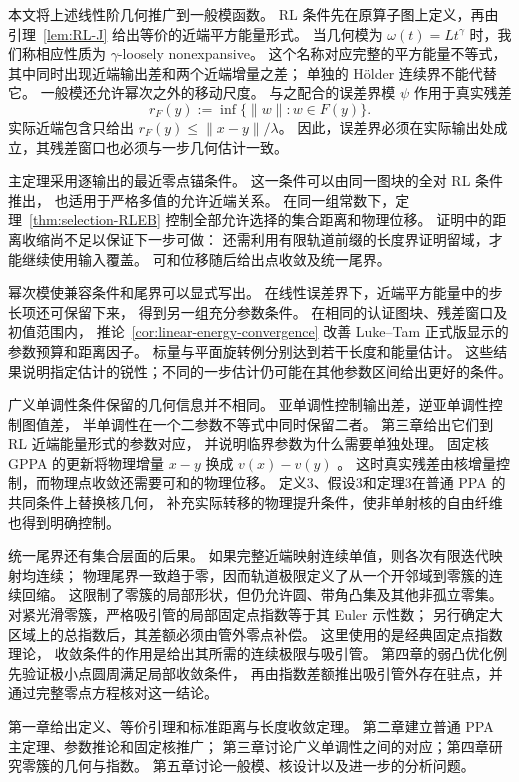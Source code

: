 本文将上述线性阶几何推广到一般模函数。
RL 条件先在原算子图上定义，再由引理~\ref{lem:RL-J}
给出等价的近端平方能量形式。
当几何模为 $\omega(t)=Lt^\gamma$ 时，我们称相应性质为
$\gamma$-loosely nonexpansive。
这个名称对应完整的平方能量不等式，
其中同时出现近端输出差和两个近端增量之差；
单独的 H\"older 连续界不能代替它。
一般模还允许幂次之外的移动尺度。
与之配合的误差界模 $\psi$ 作用于真实残差
\[
 r_F(y):=\inf\{\|w\|:w\in F(y)\}.
\]
实际近端包含只给出 $r_F(y)\le\|x-y\|/\lambda$。
因此，误差界必须在实际输出处成立，其残差窗口也必须与一步几何估计一致。

主定理采用逐输出的最近零点锚条件。
这一条件可以由同一图块的全对 RL 条件推出，
也适用于严格多值的允许近端关系。
在同一组常数下，定理~\ref{thm:selection-RLEB}
控制全部允许选择的集合距离和物理位移。
证明中的距离收缩尚不足以保证下一步可做：
还需利用有限轨道前缀的长度界证明留域，才能继续使用输入覆盖。
可和位移随后给出点收敛及统一尾界。

幂次模使兼容条件和尾界可以显式写出。
在线性误差界下，近端平方能量中的步长项还可保留下来，
得到另一组充分参数条件。
在相同的认证图块、残差窗口及初值范围内，
推论~\ref{cor:linear-energy-convergence}
改善 Luke--Tam 正式版显示的参数预算和距离因子。
标量与平面旋转例分别达到若干长度和能量估计。
这些结果说明指定估计的锐性；不同的一步估计仍可能在其他参数区间给出更好的条件。

广义单调性条件保留的几何信息并不相同。
亚单调性控制输出差，逆亚单调性控制图值差，
半单调性在一个二参数不等式中同时保留二者。
第三章给出它们到 RL 近端能量形式的参数对应，
并说明临界参数为什么需要单独处理。
固定核 GPPA 的更新将物理增量 $x-y$ 换成 $v(x)-v(y)$
\cite{BuiCombettes2020Warped}。
这时真实残差由核增量控制，而物理点收敛还需要可和的物理位移。
定义3、假设3和定理3在普通 PPA 的共同条件上替换核几何，
补充实际转移的物理提升条件，使非单射核的自由纤维也得到明确控制。

统一尾界还有集合层面的后果。
如果完整近端映射连续单值，则各次有限迭代映射均连续；
物理尾界一致趋于零，因而轨道极限定义了从一个开邻域到零簇的连续回缩。
这限制了零簇的局部形状，但仍允许圆、带角凸集及其他非孤立零集。
对紧光滑零簇，严格吸引管的局部固定点指数等于其 Euler 示性数；
另行确定大区域上的总指数后，其差额必须由管外零点补偿。
这里使用的是经典固定点指数理论\cite{BenjaminGottliebCollars}，
收敛条件的作用是给出其所需的连续极限与吸引管。
第四章的弱凸优化例先验证极小点圆周满足局部收敛条件，
再由指数差额推出吸引管外存在驻点，并通过完整零点方程核对这一结论。

第一章给出定义、等价引理和标准距离与长度收敛定理。
第二章建立普通 PPA 主定理、参数推论和固定核推广；
第三章讨论广义单调性之间的对应；第四章研究零簇的几何与指数。
第五章讨论一般模、核设计以及进一步的分析问题。

